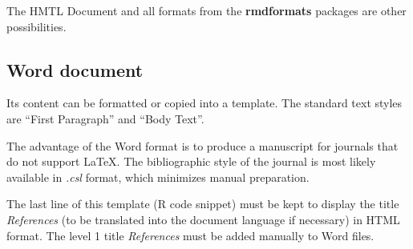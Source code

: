 \documentclass[fleqn,]{article} %
\begin{document}
The HMTL Document and all formats from the \textbf{rmdformats} packages are other possibilities.

\subsection{Word document}\label{word-document}

Its content can be formatted or copied into a template.
The standard text styles are \enquote{First Paragraph} and \enquote{Body Text}.

The advantage of the Word format is to produce a manuscript for journals that do not support LaTeX.
The bibliographic style of the journal is most likely available in \emph{.csl} format, which minimizes manual preparation.

The last line of this template (R code snippet) must be kept to display the title \emph{References} (to be translated into the document language if necessary) in HTML format.
The level 1 title \emph{References} must be added manually to Word files.



\makeatletter

\makeatother


\end{document}
